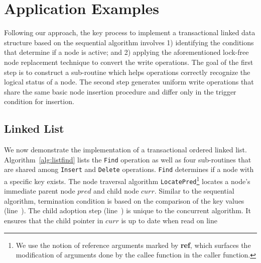 \documentclass[10pt,conference,compsocconf]{IEEEtran}
\begin{document}
\section{Application Examples}
\label{sec:application}
Following our approach, the key process to implement a transactional linked data structure based on the sequential algorithm involves 1) identifying the conditions that determine if a node is active; and 2) applying the aforementioned lock-free node replacement technique to convert the write operations.
The goal of the first step is to construct a sub-routine which helps operations correctly recognize the logical status of a node.
The second step generates uniform write operations that share the same basic node insertion procedure and differ only in the trigger condition for insertion.

\subsection{Linked List}
\label{sec:applist}
We now demonstrate the implementation of a transactional ordered linked list.
Algorithm~\ref{alg:listfind} lists the \texttt{Find} operation as well as four sub-routines that are shared among \texttt{Insert} and \texttt{Delete} operations.
\texttt{Find} determines if a node with a specific key exists.
The node traversal algorithm \texttt{LocatePred}\footnote{We use the notion of reference arguments marked by \textbf{ref}, which surfaces the modification of arguments done by the callee function in the caller function.} locates a node's immediate parent node $pred$ and child node $curr$. 
Similar to the sequential algorithm, termination condition is based on the comparison of the key values (line~).
The child adoption step (line~) is unique to the concurrent algorithm.
It ensures that the child pointer in $curr$ is up to date when read on line~
\end{document}
